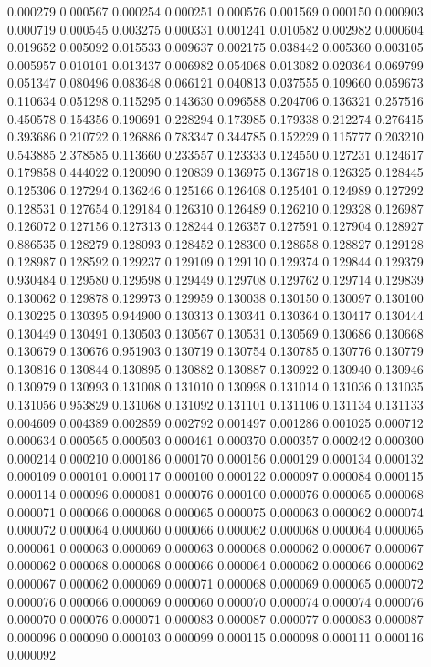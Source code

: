 0.000279
0.000567
0.000254
0.000251
0.000576
0.001569
0.000150
0.000903
0.000719
0.000545
0.003275
0.000331
0.001241
0.010582
0.002982
0.000604
0.019652
0.005092
0.015533
0.009637
0.002175
0.038442
0.005360
0.003105
0.005957
0.010101
0.013437
0.006982
0.054068
0.013082
0.020364
0.069799
0.051347
0.080496
0.083648
0.066121
0.040813
0.037555
0.109660
0.059673
0.110634
0.051298
0.115295
0.143630
0.096588
0.204706
0.136321
0.257516
0.450578
0.154356
0.190691
0.228294
0.173985
0.179338
0.212274
0.276415
0.393686
0.210722
0.126886
0.783347
0.344785
0.152229
0.115777
0.203210
0.543885
2.378585
0.113660
0.233557
0.123333
0.124550
0.127231
0.124617
0.179858
0.444022
0.120090
0.120839
0.136975
0.136718
0.126325
0.128445
0.125306
0.127294
0.136246
0.125166
0.126408
0.125401
0.124989
0.127292
0.128531
0.127654
0.129184
0.126310
0.126489
0.126210
0.129328
0.126987
0.126072
0.127156
0.127313
0.128244
0.126357
0.127591
0.127904
0.128927
0.886535
0.128279
0.128093
0.128452
0.128300
0.128658
0.128827
0.129128
0.128987
0.128592
0.129237
0.129109
0.129110
0.129374
0.129844
0.129379
0.930484
0.129580
0.129598
0.129449
0.129708
0.129762
0.129714
0.129839
0.130062
0.129878
0.129973
0.129959
0.130038
0.130150
0.130097
0.130100
0.130225
0.130395
0.944900
0.130313
0.130341
0.130364
0.130417
0.130444
0.130449
0.130491
0.130503
0.130567
0.130531
0.130569
0.130686
0.130668
0.130679
0.130676
0.951903
0.130719
0.130754
0.130785
0.130776
0.130779
0.130816
0.130844
0.130895
0.130882
0.130887
0.130922
0.130940
0.130946
0.130979
0.130993
0.131008
0.131010
0.130998
0.131014
0.131036
0.131035
0.131056
0.953829
0.131068
0.131092
0.131101
0.131106
0.131134
0.131133
0.004609
0.004389
0.002859
0.002792
0.001497
0.001286
0.001025
0.000712
0.000634
0.000565
0.000503
0.000461
0.000370
0.000357
0.000242
0.000300
0.000214
0.000210
0.000186
0.000170
0.000156
0.000129
0.000134
0.000132
0.000109
0.000101
0.000117
0.000100
0.000122
0.000097
0.000084
0.000115
0.000114
0.000096
0.000081
0.000076
0.000100
0.000076
0.000065
0.000068
0.000071
0.000066
0.000068
0.000065
0.000075
0.000063
0.000062
0.000074
0.000072
0.000064
0.000060
0.000066
0.000062
0.000068
0.000064
0.000065
0.000061
0.000063
0.000069
0.000063
0.000068
0.000062
0.000067
0.000067
0.000062
0.000068
0.000068
0.000066
0.000064
0.000062
0.000066
0.000062
0.000067
0.000062
0.000069
0.000071
0.000068
0.000069
0.000065
0.000072
0.000076
0.000066
0.000069
0.000060
0.000070
0.000074
0.000074
0.000076
0.000070
0.000076
0.000071
0.000083
0.000087
0.000077
0.000083
0.000087
0.000096
0.000090
0.000103
0.000099
0.000115
0.000098
0.000111
0.000116
0.000092
